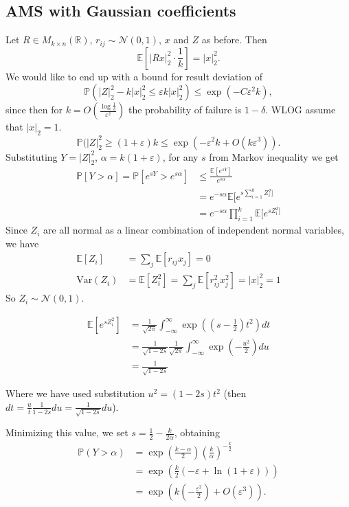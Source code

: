 \documentclass[11pt]{article}
\newcommand{\var}{\mathrm{Var}}
\begin{document}
\subsection{AMS with Gaussian coefficients}
Let $R \in M_{k \times n}(\mathbb{R})$, $r_{ij} \sim \mathcal{N}(0, 1)$, $x$ and $Z$ as before. Then
$$ \mathbb{E} \left[|Rx|_2^2 \cdot \frac{1}{k} \right] = |x|_2^2.$$
We would like to end up with a bound for result deviation of
$$ \mathbb{P}(|Z|_2^2 - k|x|_2^2 \leq \varepsilon k|x|_2^2) \leq \exp(-C \varepsilon^2 k),$$
since then for $k = O \left( \frac{\log \frac{1}{\delta}}{\varepsilon^2}\right)$ the probability of failure is $1 - \delta$.
WLOG assume that $|x|_2 = 1$.
$$ \mathbb{P}(|Z|_2^2 \geq (1+\varepsilon) k \leq \exp (-\varepsilon^2 k + O(k\varepsilon^3)). $$
Substituting $Y = |Z|_2^2$, $\alpha = k(1+\varepsilon)$, for any $s$ from Markov inequality we get
\begin{align*}
    \mathbb{P}[Y > \alpha] = \mathbb{P}[e^{sY} > e^{s\alpha}] &\leq \frac{\mathbb{E}[e^{sY}]}{e^{s\alpha}} \\
    &= e^{-s\alpha} \mathbb{E}[e^{s \sum_{i=1}^k Z_i^2]} \\
    &= e^{-s\alpha} \prod _{i=1}^k\mathbb{E}[e^{s Z_i^2]}
\end{align*}
Since $Z_i$ are all normal as a linear combination of independent normal variables, we have
\begin{align*}
    \mathbb{E}[Z_i] &= \sum_j \mathbb{E}[r_{ij} x_j] = 0 \\
    \var(Z_i) &= \mathbb{E}[Z_i^2] = \sum_j \mathbb{E}[r_{ij}^2 x_j^2] = |x|_2^2 = 1
\end{align*}
So $Z_i \sim \mathcal{N}(0,1)$.

\begin{align*}
\mathbb{E}[e^{sZ_i^2}] &= \frac{1}{ \sqrt{2 \pi}}\int_{-\infty}^{\infty} \exp \left((s-\frac{1}{2})t^{2}\right) dt \\ 
&= \frac{1}{\sqrt{1-2s}} \frac{1}{ \sqrt{2 \pi}}\int_{-\infty}^{\infty} \exp \left(-\frac{u^2}{2}\right) du \\
&= \frac{1}{\sqrt{1-2s}}
\end{align*}

Where we have used substitution $u^2 = (1-2s)t^2$ (then $dt = \frac{u}{t}\frac{1}{1-2s}du = \frac{1}{\sqrt{1-2s}}du$).


Minimizing this value, we set $s = \frac{1}{2} - \frac{k}{2 \alpha}$, obtaining
\begin{align*}
\mathbb{P}(Y > \alpha) &= \exp(\frac{k-\alpha}{2}) \left( \frac{k}{\alpha} \right)^{-\frac{k}{2}} \\
&= \exp(\frac{k}{2}(-\varepsilon +  \ln(1+\varepsilon))) \\
&= \exp(k(-\frac{\varepsilon^2}{2}) + O(\varepsilon^3)).
\end{align*}
\end{document}
